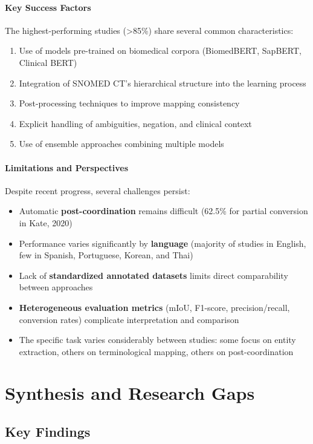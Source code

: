 \paragraph{Key Success Factors}
The highest-performing studies (>85\%) share several common characteristics:
\begin{enumerate}
    \item Use of models pre-trained on biomedical corpora (BiomedBERT, SapBERT, Clinical BERT)
    \item Integration of SNOMED CT's hierarchical structure into the learning process
    \item Post-processing techniques to improve mapping consistency
    \item Explicit handling of ambiguities, negation, and clinical context
    \item Use of ensemble approaches combining multiple models
\end{enumerate}

\paragraph{Limitations and Perspectives}
Despite recent progress, several challenges persist:
\begin{itemize}
    \item Automatic \textbf{post-coordination} remains difficult (62.5\% for partial conversion in Kate, 2020)
    \item Performance varies significantly by \textbf{language} (majority of studies in English, few in Spanish, Portuguese, Korean, and Thai)
    \item Lack of \textbf{standardized annotated datasets} limits direct comparability between approaches
    \item \textbf{Heterogeneous evaluation metrics} (mIoU, F1-score, precision/recall, conversion rates) complicate interpretation and comparison
    \item The specific task varies considerably between studies: some focus on entity extraction, others on terminological mapping, others on post-coordination
\end{itemize}

\section{Synthesis and Research Gaps}

\subsection{Key Findings}

